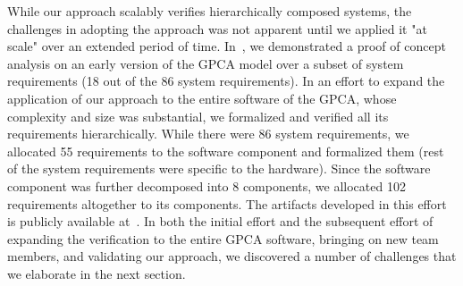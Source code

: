 While our approach scalably verifies hierarchically composed systems, the challenges in adopting the approach was not apparent until we applied it "at scale" over an extended period of time. In~\cite{hilt2013}, we demonstrated a proof of concept analysis on an early version of the GPCA model over a subset of system requirements (18 out of the 86 system requirements). In an effort to expand the application of our approach to the entire software of the GPCA, whose complexity and size was substantial, we formalized and verified all its requirements hierarchically. While there were 86 system requirements, we allocated 55 requirements to the software component and formalized them (rest of the system requirements were specific to the hardware). Since the software component was further decomposed into 8 components, we allocated 102 requirements altogether to its components. The artifacts developed in this effort is publicly available at~\cite{gpca-artifacts}. In both the initial effort and the subsequent effort of expanding the verification to the entire GPCA software, bringing on new team members, and validating our approach, we discovered a number of challenges that we elaborate in the next section.

    
%
%


